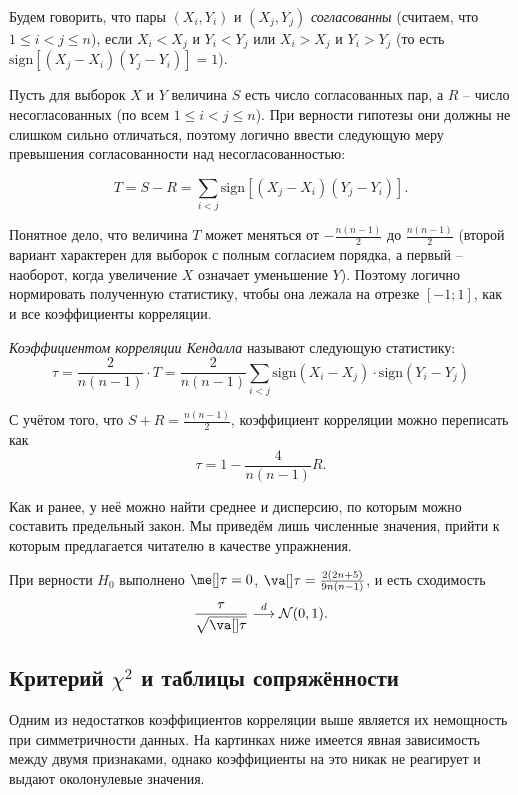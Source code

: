 \begin{definition}
    Будем говорить, что пары $(X_i, Y_i)$ и $(X_j, Y_j)$ \textit{согласованны} (считаем, что $1 \le i < j \le n$), если $X_i < X_j$ и $Y_i < Y_j$ или $X_i > X_j$ и $Y_i > Y_j$ (то есть $\mathrm{sign}\left[(X_j - X_i)(Y_j - Y_i)\right] = 1$).
\end{definition}

Пусть для выборок $X$ и $Y$ величина $S$ есть число согласованных пар, а $R$ -- число несогласованных (по всем $1 \le i < j \le n$). При верности гипотезы они должны не слишком сильно отличаться, поэтому логично ввести следующую меру превышения согласованности над несогласованностью:

\[
T = S - R = \sum_{i<j} \mathrm{sign}\left[(X_j - X_i)(Y_j - Y_i)\right].
\]

Понятное дело, что величина $T$ может меняться от $-\frac{n(n-1)}{2}$ до $\frac{n(n-1)}{2}$ (второй вариант характерен для выборок с полным согласием порядка, а первый -- наоборот, когда увеличение $X$ означает уменьшение $Y$). Поэтому логично нормировать полученную статистику, чтобы она лежала на отрезке $[-1; 1]$, как и все коэффициенты корреляции.

\begin{definition}
    \textit{Коэффициентом корреляции Кендалла} называют следующую статистику:
    \[
    \tau = \frac{2}{n(n-1)}\cdot T = \frac{2}{n(n-1)} \sum_{i < j} \mathrm{sign}(X_i - X_j)\cdot \mathrm{sign}(Y_i - Y_j)
    \]
\end{definition}

С учётом того, что $S+R=\frac{n(n-1)}{2}$, коэффициент корреляции можно переписать как
\[
\tau = 1 - \frac{4}{n(n-1)}R.
\]

Как и ранее, у неё можно найти среднее и дисперсию, по которым можно составить предельный закон. Мы приведём лишь численные значения, прийти к которым предлагается читателю в качестве упражнения.
\begin{theorem}{}{}
    При верности $H_0$ выполнено $\me[]\tau = 0$, $\va[] \tau = \frac{2(2n+5)}{9n(n-1)}$, и есть сходимость
    \[
    \frac{\tau}{\sqrt{\va[] \tau}} \stackrel{d}{\longrightarrow} \mathcal{N}(0, 1).
    \]
\end{theorem}

\subsection{Критерий $\chi^2$ и таблицы сопряжённости}

Одним из недостатков коэффициентов корреляции выше является их немощность при симметричности данных. На картинках ниже имеется явная зависимость между двумя признаками, однако коэффициенты на это никак не реагирует и выдают околонулевые значения.

